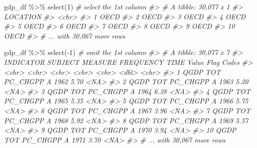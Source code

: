 \documentclass[
]{article}
\newenvironment{Shaded}{\begin{snugshade}}{\end{snugshade}}
\newcommand{\CommentTok}[1]{\textcolor[rgb]{0.56,0.35,0.01}{\textit{#1}}}
\newcommand{\DecValTok}[1]{\textcolor[rgb]{0.00,0.00,0.81}{#1}}
\newcommand{\FunctionTok}[1]{\textcolor[rgb]{0.00,0.00,0.00}{#1}}
\newcommand{\NormalTok}[1]{#1}
\newcommand{\SpecialCharTok}[1]{\textcolor[rgb]{0.00,0.00,0.00}{#1}}
\begin{document}
\begin{Shaded}
\begin{Highlighting}[]
\NormalTok{gdp\_df }\SpecialCharTok{\%\textgreater{}\%} 
  \FunctionTok{select}\NormalTok{(}\DecValTok{1}\NormalTok{) }\CommentTok{\# select the 1st column}
\CommentTok{\#\textgreater{} \# A tibble: 30,077 x 1}
\CommentTok{\#\textgreater{}    LOCATION}
\CommentTok{\#\textgreater{}    \textless{}chr\textgreater{}   }
\CommentTok{\#\textgreater{}  1 OECD    }
\CommentTok{\#\textgreater{}  2 OECD    }
\CommentTok{\#\textgreater{}  3 OECD    }
\CommentTok{\#\textgreater{}  4 OECD    }
\CommentTok{\#\textgreater{}  5 OECD    }
\CommentTok{\#\textgreater{}  6 OECD    }
\CommentTok{\#\textgreater{}  7 OECD    }
\CommentTok{\#\textgreater{}  8 OECD    }
\CommentTok{\#\textgreater{}  9 OECD    }
\CommentTok{\#\textgreater{} 10 OECD    }
\CommentTok{\#\textgreater{} \# ... with 30,067 more rows}

\NormalTok{gdp\_df }\SpecialCharTok{\%\textgreater{}\%} 
  \FunctionTok{select}\NormalTok{(}\SpecialCharTok{{-}}\DecValTok{1}\NormalTok{) }\CommentTok{\# omit the 1st column}
\CommentTok{\#\textgreater{} \# A tibble: 30,077 x 7}
\CommentTok{\#\textgreater{}    INDICATOR SUBJECT MEASURE  FREQUENCY TIME  Value \textasciigrave{}Flag Codes\textasciigrave{}}
\CommentTok{\#\textgreater{}    \textless{}chr\textgreater{}     \textless{}chr\textgreater{}   \textless{}chr\textgreater{}    \textless{}chr\textgreater{}     \textless{}chr\textgreater{} \textless{}dbl\textgreater{} \textless{}chr\textgreater{}       }
\CommentTok{\#\textgreater{}  1 QGDP      TOT     PC\_CHGPP A         1962   5.70 \textless{}NA\textgreater{}        }
\CommentTok{\#\textgreater{}  2 QGDP      TOT     PC\_CHGPP A         1963   5.20 \textless{}NA\textgreater{}        }
\CommentTok{\#\textgreater{}  3 QGDP      TOT     PC\_CHGPP A         1964   6.38 \textless{}NA\textgreater{}        }
\CommentTok{\#\textgreater{}  4 QGDP      TOT     PC\_CHGPP A         1965   5.35 \textless{}NA\textgreater{}        }
\CommentTok{\#\textgreater{}  5 QGDP      TOT     PC\_CHGPP A         1966   5.75 \textless{}NA\textgreater{}        }
\CommentTok{\#\textgreater{}  6 QGDP      TOT     PC\_CHGPP A         1967   3.96 \textless{}NA\textgreater{}        }
\CommentTok{\#\textgreater{}  7 QGDP      TOT     PC\_CHGPP A         1968   5.92 \textless{}NA\textgreater{}        }
\CommentTok{\#\textgreater{}  8 QGDP      TOT     PC\_CHGPP A         1969   5.57 \textless{}NA\textgreater{}        }
\CommentTok{\#\textgreater{}  9 QGDP      TOT     PC\_CHGPP A         1970   3.94 \textless{}NA\textgreater{}        }
\CommentTok{\#\textgreater{} 10 QGDP      TOT     PC\_CHGPP A         1971   3.70 \textless{}NA\textgreater{}        }
\CommentTok{\#\textgreater{} \# ... with 30,067 more rows}


\end{Highlighting}
\end{Shaded}
\end{document}
